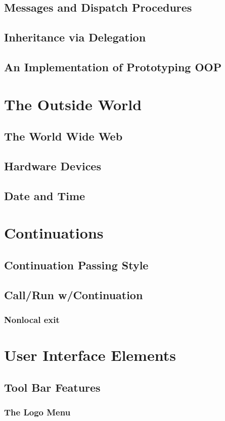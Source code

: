 \documentclass{report}
\begin{document}
\section{Messages and Dispatch Procedures}
\section{Inheritance via Delegation}
\section{An Implementation of Prototyping OOP}
\chapter{The Outside World}
\section{The World Wide Web}
\section{Hardware Devices}
\section{Date and Time}
\chapter{Continuations}
\section{Continuation Passing Style}
\section{Call/Run w/Continuation}
\subsection{Nonlocal exit}
\chapter{User Interface Elements}
\section{Tool Bar Features}
\subsection{The \Snap{} Logo Menu}
\end{document}
